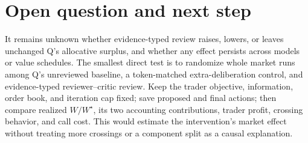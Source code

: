 \documentclass{article}
\begin{document}
\section*{Open question and next step}

It remains unknown whether evidence-typed review raises, lowers, or leaves unchanged Q's allocative surplus, and whether any effect persists across models or value schedules. The smallest direct test is to randomize whole market runs among Q's unreviewed baseline, a token-matched extra-deliberation control, and evidence-typed reviewer--critic review. Keep the trader objective, information, order book, and iteration cap fixed; save proposed and final actions; then compare realized \(W/W^\star\), its two accounting contributions, trader profit, crossing behavior, and call cost. This would estimate the intervention's market effect without treating more crossings or a component split as a causal explanation. 
\end{document}
